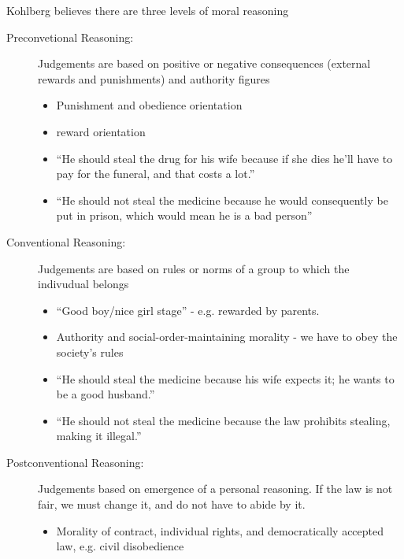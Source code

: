 \documentclass[../main/main.tex]{subfiles}
\begin{document}
Kohlberg believes there are three levels of moral reasoning
\begin{description}
	\item[Preconvetional Reasoning:] Judgements are based on positive or negative consequences (external rewards and punishments) and authority figures

        \begin{itemize}
          \item Punishment and obedience orientation
          \item reward orientation
        \end{itemize}
        \begin{example}
\begin{itemize}
\item ``He should steal the drug for his wife because if she dies he'll have to pay for the funeral, and that costs a lot.''
        \item ``He should not steal the medicine because he would consequently be put in prison, which would mean he is a bad person''
\end{itemize}
        \end{example}
        \item[Conventional Reasoning:]Judgements are based on rules or norms of a group to which the indivudual belongs
        \begin{itemize}
          \item ``Good boy/nice girl stage'' - e.g. rewarded by parents.
          \item Authority and social-order-maintaining morality - we have to obey the society's rules
        \end{itemize}
        \begin{example}
\begin{itemize}
\item ``He should steal the medicine because his wife expects it; he wants to be a good husband.''
        \item ``He should not steal the medicine because the law prohibits stealing, making it illegal.''
\end{itemize}
        \end{example}
        \item[Postconventional Reasoning:]Judgements based on emergence of a personal reasoning. If the law is not fair, we must change it, and do not have to abide by it.
        \begin{itemize}
          \item Morality of contract, individual rights, and democratically accepted law, e.g. civil disobedience

\end{itemize}
\end{description}
\end{document}
